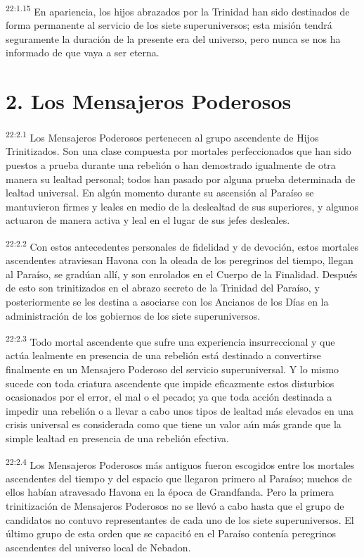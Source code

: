 \par
\textsuperscript{22:1.15} En apariencia, los hijos abrazados por la Trinidad han sido destinados de forma permanente al servicio de los siete superuniversos; esta misión tendrá seguramente la duración de la presente era del universo, pero nunca se nos ha informado de que vaya a ser eterna.

\section*{2. Los Mensajeros Poderosos}
\par
\textsuperscript{22:2.1} Los Mensajeros Poderosos pertenecen al grupo ascendente de Hijos Trinitizados. Son una clase compuesta por mortales perfeccionados que han sido puestos a prueba durante una rebelión o han demostrado igualmente de otra manera su lealtad personal; todos han pasado por alguna prueba determinada de lealtad universal. En algún momento durante su ascensión al Paraíso se mantuvieron firmes y leales en medio de la deslealtad de sus superiores, y algunos actuaron de manera activa y leal en el lugar de sus jefes desleales.

\par
\textsuperscript{22:2.2} Con estos antecedentes personales de fidelidad y de devoción, estos mortales ascendentes atraviesan Havona con la oleada de los peregrinos del tiempo, llegan al Paraíso, se gradúan allí, y son enrolados en el Cuerpo de la Finalidad. Después de esto son trinitizados en el abrazo secreto de la Trinidad del Paraíso, y posteriormente se les destina a asociarse con los Ancianos de los Días en la administración de los gobiernos de los siete superuniversos.

\par
\textsuperscript{22:2.3} Todo mortal ascendente que sufre una experiencia insurreccional y que actúa lealmente en presencia de una rebelión está destinado a convertirse finalmente en un Mensajero Poderoso del servicio superuniversal. Y lo mismo sucede con toda criatura ascendente que impide eficazmente estos disturbios ocasionados por el error, el mal o el pecado; ya que toda acción destinada a impedir una rebelión o a llevar a cabo unos tipos de lealtad más elevados en una crisis universal es considerada como que tiene un valor aún más grande que la simple lealtad en presencia de una rebelión efectiva.

\par
\textsuperscript{22:2.4} Los Mensajeros Poderosos más antiguos fueron escogidos entre los mortales ascendentes del tiempo y del espacio que llegaron primero al Paraíso; muchos de ellos habían atravesado Havona en la época de Grandfanda. Pero la primera trinitización de Mensajeros Poderosos no se llevó a cabo hasta que el grupo de candidatos no contuvo representantes de cada uno de los siete superuniversos. El último grupo de esta orden que se capacitó en el Paraíso contenía peregrinos ascendentes del universo local de Nebadon.


